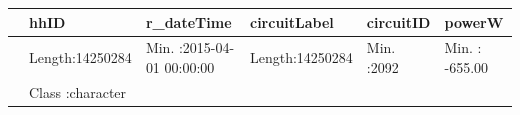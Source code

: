 \documentclass[]{article}
\begin{document}
\begin{longtable}[]{@{}llllll@{}}
\toprule
\begin{minipage}[b]{0.03\columnwidth}\raggedright\strut
\strut
\end{minipage} & \begin{minipage}[b]{0.15\columnwidth}\raggedright\strut
hhID\strut
\end{minipage} & \begin{minipage}[b]{0.24\columnwidth}\raggedright\strut
r\_dateTime\strut
\end{minipage} & \begin{minipage}[b]{0.15\columnwidth}\raggedright\strut
circuitLabel\strut
\end{minipage} & \begin{minipage}[b]{0.12\columnwidth}\raggedright\strut
circuitID\strut
\end{minipage} & \begin{minipage}[b]{0.15\columnwidth}\raggedright\strut
powerW\strut
\end{minipage}\tabularnewline
\midrule
\endhead
\begin{minipage}[t]{0.03\columnwidth}\raggedright\strut
\strut
\end{minipage} & \begin{minipage}[t]{0.15\columnwidth}\raggedright\strut
Length:14250284\strut
\end{minipage} & \begin{minipage}[t]{0.24\columnwidth}\raggedright\strut
Min. :2015-04-01 00:00:00\strut
\end{minipage} & \begin{minipage}[t]{0.15\columnwidth}\raggedright\strut
Length:14250284\strut
\end{minipage} & \begin{minipage}[t]{0.12\columnwidth}\raggedright\strut
Min. :2092\strut
\end{minipage} & \begin{minipage}[t]{0.15\columnwidth}\raggedright\strut
Min. : -655.00\strut
\end{minipage}\tabularnewline
\begin{minipage}[t]{0.03\columnwidth}\raggedright\strut
\strut
\end{minipage} & \begin{minipage}[t]{0.15\columnwidth}\raggedright\strut
Class :character\strut
\end{minipage} & \begin{minipage}[t]{0.24\columnwidth}\raggedright\strut

\end{minipage}
\end{longtable}
\end{document}
